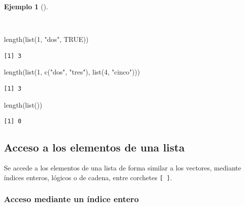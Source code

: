 \documentclass[
  spanish,
  a4paper,
]{scrreport}
\newenvironment{Shaded}{\begin{snugshade}}{\end{snugshade}}
\newcommand{\ConstantTok}[1]{\textcolor[rgb]{0.56,0.35,0.01}{#1}}
\newcommand{\DecValTok}[1]{\textcolor[rgb]{0.68,0.00,0.00}{#1}}
\newcommand{\FunctionTok}[1]{\textcolor[rgb]{0.28,0.35,0.67}{#1}}
\newcommand{\NormalTok}[1]{\textcolor[rgb]{0.00,0.23,0.31}{#1}}
\newcommand{\StringTok}[1]{\textcolor[rgb]{0.13,0.47,0.30}{#1}}
\theoremstyle{definition}
\theoremstyle{definition}
\newtheorem{example}{Ejemplo}[chapter]
\theoremstyle{remark}
\begin{document}
\begin{example}[]\protect\hypertarget{exm-tamaño-lista}{}\label{exm-tamaño-lista}

~

\begin{Shaded}
\begin{Highlighting}[]
\FunctionTok{length}\NormalTok{(}\FunctionTok{list}\NormalTok{(}\DecValTok{1}\NormalTok{, }\StringTok{"dos"}\NormalTok{, }\ConstantTok{TRUE}\NormalTok{))}
\end{Highlighting}
\end{Shaded}

\begin{verbatim}
[1] 3
\end{verbatim}

\begin{Shaded}
\begin{Highlighting}[]
\FunctionTok{length}\NormalTok{(}\FunctionTok{list}\NormalTok{(}\DecValTok{1}\NormalTok{, }\FunctionTok{c}\NormalTok{(}\StringTok{"dos"}\NormalTok{, }\StringTok{"tres"}\NormalTok{), }\FunctionTok{list}\NormalTok{(}\DecValTok{4}\NormalTok{, }\StringTok{"cinco"}\NormalTok{)))}
\end{Highlighting}
\end{Shaded}

\begin{verbatim}
[1] 3
\end{verbatim}

\begin{Shaded}
\begin{Highlighting}[]
\FunctionTok{length}\NormalTok{(}\FunctionTok{list}\NormalTok{())}
\end{Highlighting}
\end{Shaded}

\begin{verbatim}
[1] 0
\end{verbatim}

\end{example}

\subsection{Acceso a los elementos de una
lista}\label{acceso-a-los-elementos-de-una-lista}

Se accede a los elementos de una lista de forma similar a los vectores,
mediante índices enteros, lógicos o de cadena, entre corchetes
\texttt{{[}\ {]}}.

\subsubsection{Acceso mediante un índice
entero}\label{acceso-mediante-un-uxedndice-entero-1}
\end{document}
